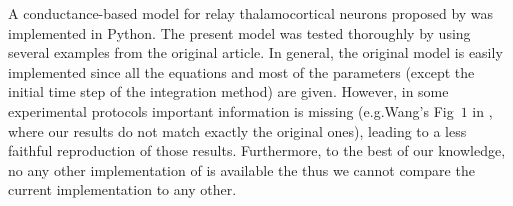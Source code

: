 \documentclass[10pt,a4paper,onecolumn]{article}
\begin{document}
A conductance-based model for relay thalamocortical neurons proposed 
by \cite{wang:1994} was implemented in Python. The present model was tested 
thoroughly by using several examples from the original article. In general, 
the original model is easily implemented since all the equations and most
of the parameters (except the initial time step of the integration method) are
given. However, in some experimental protocols important information is
missing (e.g.\@ Wang's Fig~$1$ in \cite{wang:1994}, where our results do not
match exactly the original ones), leading to a less faithful reproduction of
those results. Furthermore, to the best of our knowledge, no any other
implementation of \cite{wang:1994} is available the thus we cannot compare
the current implementation to any other. 

{\sffamily \small
  \printbibliography[title=References]
}
\end{document}
